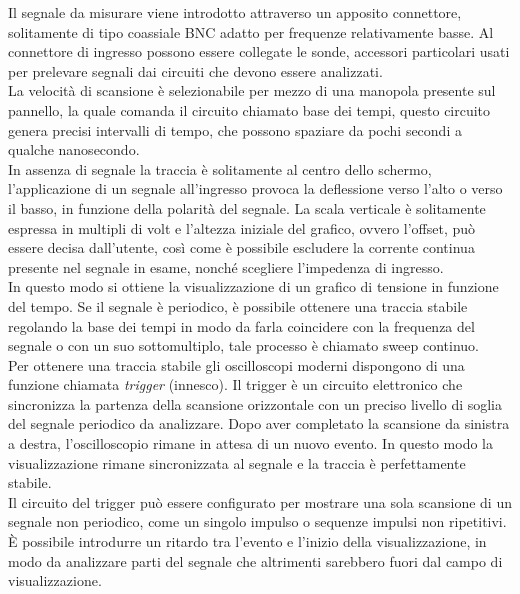 \documentclass[12pt, letterpaper]{book}
\begin{document}
Il segnale da misurare viene introdotto attraverso un apposito connettore, solitamente di tipo coassiale BNC adatto per frequenze relativamente basse. Al connettore di ingresso possono essere collegate le sonde, accessori particolari usati per prelevare segnali dai circuiti che devono essere analizzati.\\
La velocità di scansione è selezionabile per mezzo di una manopola presente sul pannello, la quale comanda il circuito chiamato base dei tempi, questo circuito genera precisi  intervalli di tempo, che possono spaziare da pochi secondi a qualche nanosecondo.\\
In assenza di segnale  la traccia è solitamente al centro dello schermo, l'applicazione di un segnale
all'ingresso provoca la deflessione verso l'alto o verso il basso, in funzione della polarità del segnale. La scala verticale è solitamente espressa in multipli di volt e l'altezza iniziale del grafico, ovvero l'offset, può essere decisa dall'utente, così come è possibile escludere la corrente continua presente nel segnale in esame, nonché scegliere l'impedenza di ingresso.\\
In questo modo si ottiene la visualizzazione di un grafico di tensione in funzione del tempo. Se il segnale è periodico, è possibile ottenere una traccia stabile regolando la base dei tempi in modo da farla coincidere con la frequenza del segnale o con un suo sottomultiplo, tale processo è chiamato
sweep continuo.\\
Per ottenere una traccia stabile gli oscilloscopi moderni dispongono di una funzione chiamata \textit{trigger} (innesco). Il trigger è un circuito elettronico che sincronizza la partenza della scansione orizzontale con un preciso livello di soglia del segnale periodico da analizzare. Dopo aver completato la scansione da sinistra a destra, l'oscilloscopio rimane in attesa di un nuovo evento. In questo modo la visualizzazione rimane sincronizzata al segnale e la traccia è perfettamente stabile. \\
Il circuito del trigger può essere configurato per mostrare una sola scansione di un segnale non periodico, come un singolo impulso o sequenze impulsi non ripetitivi. È possibile introdurre un ritardo tra l'evento e l'inizio della visualizzazione, in modo da analizzare parti del segnale che altrimenti sarebbero fuori dal campo di visualizzazione.
\end{document}
